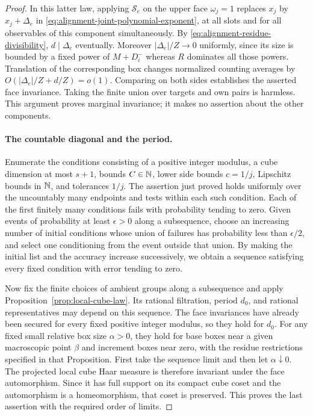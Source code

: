 \begin{proof}
In this latter law, applying $\mathcal S_e$ on the upper face
$\omega_j=1$ replaces $x_j$ by $x_j+\Delta_e$ in
\eqref{eq:alignment-joint-polynomial-exponent}, at all slots and
for all observables of this component simultaneously.
By \eqref{eq:alignment-residue-divisibility}, $d\mid\Delta_e$
eventually.  Moreover $|\Delta_e|/Z\to0$ uniformly, since its
size is bounded by a fixed power of $M+D_i^-$ whereas $R$
dominates all those powers.  Translation of the corresponding
box changes normalized counting averages by
$O(|\Delta_e|/Z+d/Z)=o(1)$.  Comparing on both sides establishes
the asserted face invariance.  Taking the finite union over
targets and own pairs is harmless.  This argument proves marginal
invariance; it makes no assertion about the other components.

\paragraph{The countable diagonal and the period.}
Enumerate the conditions consisting of a positive integer modulus,
a cube dimension at most $s+1$, bounds $C\in\mathbb N$, lower side
bounds $c=1/j$, Lipschitz bounds in $\mathbb N$, and tolerances $1/j$.
The assertion just proved holds uniformly over the uncountably
many endpoints and tests within each such condition.  Each of
the first finitely many conditions fails with probability tending
to zero.  Given events of probability at least $\epsilon>0$ along
a subsequence, choose an increasing number of initial conditions
whose union of failures has probability less than $\epsilon/2$,
and select one conditioning from the event outside that union.
By making the initial list and the accuracy increase successively,
we obtain a sequence satisfying every fixed condition with error
tending to zero.

Now fix the finite choices of ambient groups along a subsequence
and apply Proposition~\ref{prop:local-cube-law}.  Its rational
filtration, period $d_0$, and rational representatives may depend
on this sequence.  The face invariances have already been secured
for every fixed positive integer modulus, so they hold for $d_0$.
For any fixed small relative box size $\alpha>0$, they hold for
base boxes near a given macroscopic point $\beta$ and increment
boxes near zero, with the residue restrictions specified in that
Proposition.  First take the sequence limit and then let
$\alpha\downarrow0$.  The projected local cube Haar measure is
therefore invariant under the face automorphism.  Since it has
full support on its compact cube coset and the automorphism is a
homeomorphism, that coset is preserved.  This proves the last
assertion with the required order of limits.
\end{proof}

